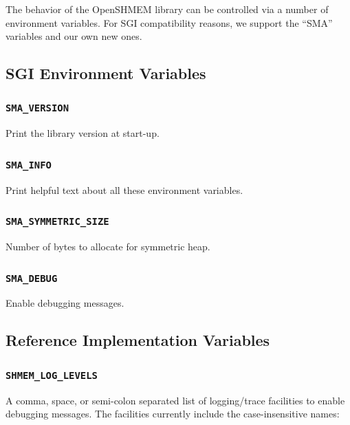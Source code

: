 \documentclass[english]{article}
\begin{document}
The behavior of the OpenSHMEM library can be controlled via a number
of environment variables. For SGI compatibility reasons, we support
the ``SMA'' variables and our own new ones.

\subsection{SGI Environment Variables}

\subsubsection*{\texttt{SMA\_VERSION}}

Print the library version at start-up.

\subsubsection*{\texttt{SMA\_INFO}}

Print helpful text about all these environment variables.

\subsubsection*{\texttt{SMA\_SYMMETRIC\_SIZE}}

Number of bytes to allocate for symmetric heap.

\subsubsection*{\texttt{SMA\_DEBUG}}

Enable debugging messages.

\subsection{Reference Implementation Variables}

\subsubsection*{\texttt{SHMEM\_LOG\_LEVELS}}

A comma, space, or semi-colon separated list of logging/trace
facilities to enable debugging messages. The facilities currently
include the case-insensitive names:
\end{document}

